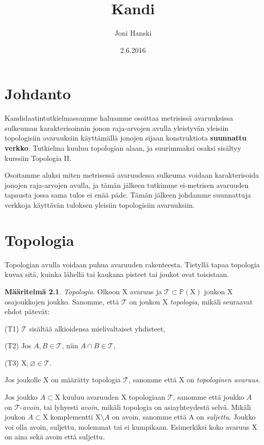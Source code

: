 \documentclass[12pt,a4paper,leqno]{report}
\title{Kandi}
\author{Joni Hanski}
\date{2.6.2016}
\newcommand{\X}{\mathrm{X}}
\newcommand{\Pow}{\mathbb{P}}
\newcommand{\T}{\mathcal{T}}
\theoremstyle{plain}
\theoremstyle{definition}
\newtheorem{maar}[equation]{Määritelmä}
\theoremstyle{remark}
\begin{document}
\maketitle

\tableofcontents

\chapter{Johdanto}\label{johd}

Kandidaatintutkielmassamme haluamme osoittaa metrisissä avaruuksissa sulkeuman karakterisoinnin jonon raja-arvojen avulla yleistyvän yleisiin topologisiin avaruuksiin käyttämällä jonojen sijaan konstruktiota \textbf{suunnattu verkko}. Tutkielma kuuluu topologian alaan, ja suurimmaksi osaksi sisältyy kurssiin Topologia II.

Osoitamme aluksi miten metrisessä avaruudessa sulkeuma voidaan karakterisoida jonojen raja-arvojen avulla, ja tämän jälkeen tutkimme ei-metrisen avaruuden tapausta jossa sama tulos ei enää päde. Tämän jälkeen johdamme suunnattuja verkkoja käyttävän tuloksen yleisiin topologisiin avaruuksiin.

\chapter{Topologia}\label{TOP}

Topologian avulla voidaan puhua avaruuden rakenteesta. Tietyllä tapaa topologia kuvaa sitä, kuinka lähellä tai kaukana pisteet tai joukot ovat toisistaan.

\begin{maar}\label{topmaar}
\emph{Topologia}. Olkoon $\X$ avaruus ja $\T \subset \Pow(\X)$ joukon $\X$ osajoukkojen joukko. Sanomme, että $\T$ on joukon $\X$ \emph{topologia}, mikäli seuraavat ehdot pätevät:

(T1) $\T$ sisältää alkioidensa mielivaltaiset yhdisteet,

(T2) Jos $A,B \in \T$, niin $A \cap B \in \T$,

(T3) $\X, \varnothing \in \T$.
\end{maar}

Jos joukolle $\X$ on määrätty topologia $\T$, sanomme että $\X$ on \emph{topologinen avaruus}.

Jos joukko $A \subset \X$ kuuluu avaruuden $\X$ topologiaan $\T$, sanomme että joukko $A$ on $\T$-\emph{avoin}, tai lyhyesti \emph{avoin}, mikäli topologia on asiayhteydestä selvä. Mikäli joukon $A \subset \X$ komplementti $\X \setminus A$ on avoin, sanomme että A on \emph{suljettu}. Joukko voi olla avoin, suljettu, molemmat tai ei kumpikaan. Esimerkiksi koko avaruus $\X$ on aina sekä avoin että suljettu.
\end{document}
